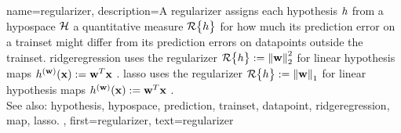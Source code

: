 {name={regularizer}, 
	description={A regularizer 
		assigns each \gls{hypothesis} $h$ from a \gls{hypospace} $\mathcal{H}$ a quantitative 
		measure $\mathcal{R}\big\{ h \big\}$ for how much its \gls{prediction} error on a \gls{trainset} might 
		differ from its \gls{prediction} errors on \glspl{datapoint} outside the \gls{trainset}. \Gls{ridgeregression} 
		uses the regularizer $\mathcal{R}\big\{ h \big\} := \left\Vert {{\bf w}} \right\Vert_{2}^{2}$ for linear \gls{hypothesis} 
		\glspl{map} $h^{({\bf w})}({\bf x}) := {\bf w}^{T} {\bf x}$ \cite[Ch. 3]{MLBasics}. 
		\Gls{lasso} uses the regularizer $\mathcal{R}\big\{ h \big\} := \left\Vert {{\bf w}} \right\Vert_{1}$ 
		for linear \gls{hypothesis} \glspl{map} $h^{({\bf w})}({\bf x}) := {\bf w}^{T} {\bf x}$ \cite[Ch. 3]{MLBasics}.
				\\
		See also: \gls{hypothesis}, \gls{hypospace}, \gls{prediction}, \gls{trainset}, \gls{datapoint}, \gls{ridgeregression}, \gls{map}, \gls{lasso}. },
	first={regularizer},
	text={regularizer} 
}


